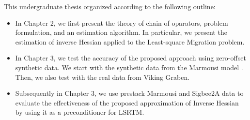 This undergraduate thesis organized according to the following outline:
 
\begin{itemize}

\item In Chapter 2, we first present the theory of chain of oparators, problem formulation, and an estimation algorithm. In particular, we present the estimation of inverse Hessian applied to the Least-square Migration problem. 

\item In Chapter 3, we test the accuracy of the proposed approach using zero-offset synthetic data. We start with the synthetic data from the Marmousi model \cite[]{versteeg1994}. Then, we also test with the real data from Viking Graben. 

\item Subsequently in Chapter 3, we use prestack Marmousi and Sigbee2A data to evaluate the effectiveness of the proposed approximation of Inverse Hessian by using it as a preconditioner for LSRTM.
\end{itemize}
